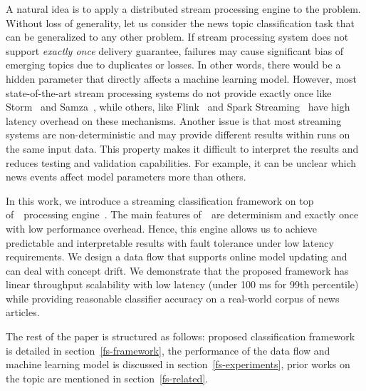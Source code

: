 A natural idea is to apply a distributed stream processing engine to the problem. Without loss of generality, let us consider the news topic classification task that can be generalized to any other problem. If stream processing system does not support {\em exactly once} delivery guarantee, failures may cause significant bias of emerging topics due to duplicates or losses. In other words, there would be a hidden parameter that directly affects a machine learning model. However, most state-of-the-art stream processing systems do not provide exactly once like Storm~\cite{apache:storm} and Samza~\cite{Noghabi:2017:SSS:3137765.3137770}, while others, like Flink~\cite{Carbone:2017:SMA:3137765.3137777} and Spark Streaming~\cite{Zaharia:2012:DSE:2342763.2342773} have high latency overhead on these mechanisms. Another issue is that most streaming systems are non-deterministic and may provide different results within runs on the same input data. This property makes it difficult to interpret the results and reduces testing and validation capabilities. For example, it can be unclear which news events affect model parameters more than others. 

In this work, we introduce a streaming classification framework on top of~\FlameStream\ processing engine~\cite{we2018beyondmr, we2018adbis}. The main features of~\FlameStream\ are determinism and exactly once with low performance overhead. Hence, this engine allows us to achieve predictable and interpretable results with fault tolerance under low latency requirements. We design a data flow that supports online model updating and can deal with concept drift. We demonstrate that the proposed framework has linear throughput scalability with low latency (under 100 ms for 99th percentile) while providing reasonable classifier accuracy on a real-world corpus of news articles.

The rest of the paper is structured as follows: proposed classification framework is detailed in section~\ref{fs-framework}, the performance of the data flow and machine learning model is discussed in section~\ref{fs-experiments}, prior works on the topic are mentioned in section~\ref{fs-related}.

